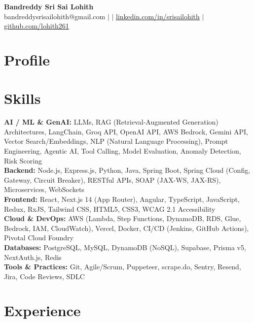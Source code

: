 \documentclass[10pt,letterpaper]{article}
\newcommand{\skillrow}[2]{\textbf{#1:} #2 \\[1pt]}
\begin{document}
\begin{center}
  {\Huge\bfseries Bandreddy Sri Sai Lohith}\\[3pt]
  \small bandreddysrisailohith@gmail.com $\vert$ $\vert$\; \href{https://linkedin.com/in/srisailohith}{linkedin.com/in/srisailohith} $\vert$\; \href{https://github.com/lohith261}{github.com/lohith261}
\end{center}

\section{Profile}


\section{Skills}

\skillrow{AI / ML \& GenAI}{LLMs, RAG (Retrieval-Augmented Generation) Architectures, LangChain, Groq API, OpenAI API, AWS Bedrock, Gemini API, Vector Search/Embeddings, NLP (Natural Language Processing), Prompt Engineering, Agentic AI, Tool Calling, Model Evaluation, Anomaly Detection, Risk Scoring}
\skillrow{Backend}{Node.js, Express.js, Python, Java, Spring Boot, Spring Cloud (Config, Gateway, Circuit Breaker), RESTful APIs, SOAP (JAX-WS, JAX-RS), Microservices, WebSockets}
\skillrow{Frontend}{React, Next.js 14 (App Router), Angular, TypeScript, JavaScript, Redux, RxJS, Tailwind CSS, HTML5, CSS3, WCAG 2.1 Accessibility}
\skillrow{Cloud \& DevOps}{AWS (Lambda, Step Functions, DynamoDB, RDS, Glue, Bedrock, IAM, CloudWatch), Vercel, Docker, CI/CD (Jenkins, GitHub Actions), Pivotal Cloud Foundry}
\skillrow{Databases}{PostgreSQL, MySQL, DynamoDB (NoSQL), Supabase, Prisma v5, NextAuth.js, Redis}
\skillrow{Tools \& Practices}{Git, Agile/Scrum, Puppeteer, scrape.do, Sentry, Resend, Jira, Code Reviews, SDLC}

\section{Experience}
\end{document}
